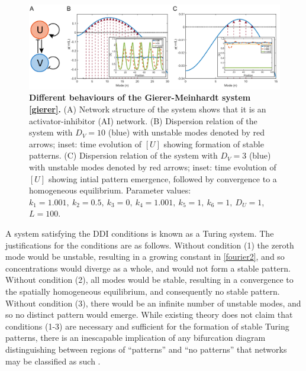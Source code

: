 \begin{figure}
\centering
\includegraphics[width=\linewidth]{disp1}
\caption{\textbf{Different behaviours of the Gierer-Meinhardt system \eqref{gierer}.} (A) Network structure of the system shows that it is an activator-inhibitor (AI) network. (B) Dispersion relation of the system with $D_V=10$ (blue) with unstable modes denoted by red arrows; inset: time evolution of $[U]$ showing formation of stable patterns. (C) Dispersion relation of the system with $D_V=3$ (blue) with unstable modes denoted by red arrows; inset: time evolution of $[U]$ showing intial pattern emergence, followed by convergence to a homogeneous equilibrium. Parameter values: $k_1=1.001,~k_2=0.5,~k_3=0,~k_4=1.001,~k_5=1,~k_6=1,~D_U=1$, $L=100$.}\label{fig1}
\end{figure}

A system satisfying the DDI conditions is known as a Turing system. The justifications for the conditions are as follows. Without condition (1) the zeroth mode would be unstable, resulting in a growing constant in \eqref{fourier2}, and so concentrations would diverge as a whole, and would not form a stable pattern. Without condition (2), all modes would be stable, resulting in a convergence to the spatially homogeneous equilibrium, and consequently no stable pattern. Without condition (3), there would be an infinite number of unstable modes, and so no distinct pattern would emerge. While existing theory does not claim that conditions (1-3) are necessary and sufficient for the formation of stable Turing patterns, there is an inescapable implication of any bifurcation diagram distinguishing between regions of ``patterns'' and ``no patterns'' that networks may be classified as such \cite{murray2001mathematical,klika2012influence,marcon2016high,smith2018model}. 


